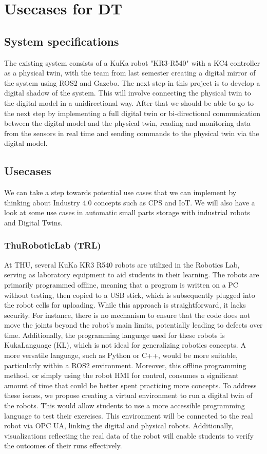 \section{Usecases for DT}

\subsection{System specifications}

The existing system consists of a KuKa robot "KR3-R540" with a KC4 controller as a physical twin, with the team from last semester creating a digital mirror of the system using ROS2 and Gazebo.
The next step in this project is to develop a digital shadow of the system. This will involve connecting the physical twin to the digital model in a unidirectional way.
After that we should be able to go to the next step by implementing a full digital twin or bi-directional communication between the digital model and the physical twin, 
reading and monitoring data from the sensors in real time and sending commands to the physical twin via the digital model. 

\subsection{Usecases}

We can take a step towards potential use cases that we can implement by thinking about Industry 4.0 concepts such as CPS and IoT.
We will also have a look at some use cases in automatic small parts storage with industrial robots and Digital Twins.

\subsubsection{ThuRoboticLab (TRL)}
At THU, several KuKa KR3 R540 robots are utilized in the Robotics Lab, 
serving as laboratory equipment to aid students in their learning. 
The robots are primarily programmed offline, 
meaning that a program is written on a PC without testing, 
then copied to a USB stick, 
which is subsequently plugged into the robot cells for uploading.
While this approach is straightforward, 
it lacks security. For instance, 
there is no mechanism to ensure that the code does not move the joints beyond 
the robot's main limits, potentially leading to defects over time. Additionally, 
the programming language used for these robots is KukaLanguage (KL), 
which is not ideal for generalizing robotics concepts. 
A more versatile language, such as Python or C++, would be more suitable, 
particularly within a ROS2 environment.
Moreover, this offline programming method, 
or simply using the robot HMI for control, consumes a significant amount of time 
that could be better spent practicing more concepts.
To address these issues, 
we propose creating a virtual environment to run a digital twin of the robots. 
This would allow students to use a more accessible programming language to test 
their exercises. This environment will be connected to the real robot via OPC UA, 
linking the digital and physical robots. Additionally, 
visualizations reflecting the real data of the robot will enable students to 
verify the outcomes of their runs effectively.

